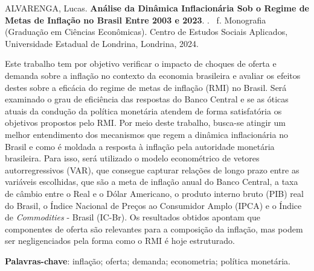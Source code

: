 \documentclass[12pt,oneside,a4paper,chapter=TITLE,english,brazil,sumario=abnt-6027-2012]{abntex2}
\begin{document}
\setlength{\absparsep}{18pt} %
\begin{resumo}

	\noindent
	ALVARENGA, Lucas. {\bfseries Análise da Dinâmica Inflacionária Sob o Regime de Metas de Inflação no Brasil Entre 2003 e 2023}. \imprimirdata. \ztotpages \, f. Monografia (Graduação em Ciências Econômicas). Centro de Estudos Sociais Aplicados, Universidade Estadual de Londrina, Londrina, 2024.
	
	Este trabalho tem por objetivo verificar o impacto de choques de oferta e demanda sobre a inflação no contexto da economia brasileira e avaliar os efeitos destes sobre a eficácia do regime de metas de inflação (RMI) no Brasil. Será examinado o grau de eficiência das respostas do Banco Central e se as óticas atuais da condução da política monetária atendem de forma satisfatória os objetivos propostos pelo RMI. Por meio deste trabalho, busca-se atingir um melhor entendimento dos mecanismos que regem a dinâmica inflacionária no Brasil e como é moldada a resposta à inflação pela autoridade monetária brasileira. Para isso, será utilizado o modelo econométrico de vetores autorregressivos (VAR), que consegue capturar relações de longo prazo entre as variáveis escolhidas, que são a meta de inflação anual do Banco Central, a taxa de câmbio entre o Real e o Dólar Americano, o produto interno bruto (PIB) real do Brasil, o Índice Nacional de Preços ao Consumidor Amplo (IPCA) e o Índice de \textit{Commodities} - Brasil (IC-Br). Os resultados obtidos apontam que componentes de oferta são relevantes para a composição da inflação, mas podem ser negligenciados pela forma como o RMI é hoje estruturado.
	
	\textbf{Palavras-chave}: inflação; oferta; demanda; econometria; política monetária.
\end{resumo}





\end{document}
